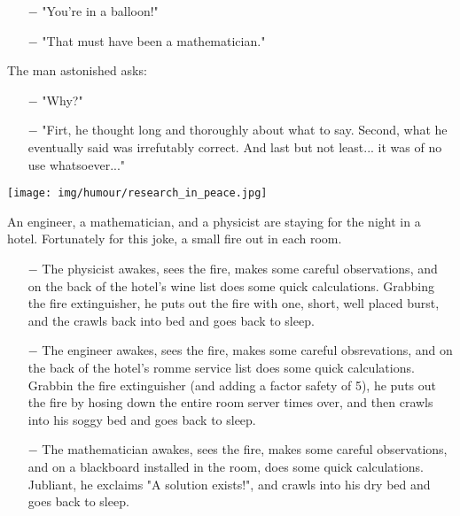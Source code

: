 \begin{itemize}	 
	\item[$-$]  "You're in a balloon!"

	\item[$-$] "That must have been a mathematician."
\end{itemize}

The man astonished asks:

\begin{itemize}	 
	\item[$-$] "Why?"

	\item[$-$]  "Firt, he thought long and thoroughly about what to say. Second, what he eventually said was irrefutably correct. And last but not least... it was of no use whatsoever..."
\end{itemize}	
\begin{center}\underline{\hspace{5 cm}}\end{center}
	
	\begin{center}
		\texttt{[image: img/humour/research\_in\_peace.jpg]}	
	\end{center}
	
\begin{center}\underline{\hspace{5 cm}}\end{center}

An engineer, a mathematician, and a physicist are staying for the night in a hotel. Fortunately for this joke, a small fire out in each room.

\begin{itemize}	 
	\item[$-$] The physicist awakes, sees the fire, makes some careful observations, and on the back of the hotel's wine list does some quick calculations. Grabbing the fire extinguisher, he puts out the fire with one, short, well placed burst, and the crawls back into bed and goes back to sleep.

	\item[$-$] The engineer awakes, sees the fire, makes some careful obsrevations, and on the back of the hotel's romme service list does some quick calculations. Grabbin the fire extinguisher (and adding a factor safety of 5), he puts out the fire by hosing down the entire room server times over, and then crawls into his soggy bed and goes back to sleep.

	\item[$-$] The mathematician awakes, sees the fire, makes some careful observations, and on a blackboard installed in the room, does some quick calculations. Jubliant, he exclaims "A solution exists!", and crawls into his dry bed and goes back to sleep.
\end{itemize}	
\begin{center}\underline{\hspace{5 cm}}\end{center}

